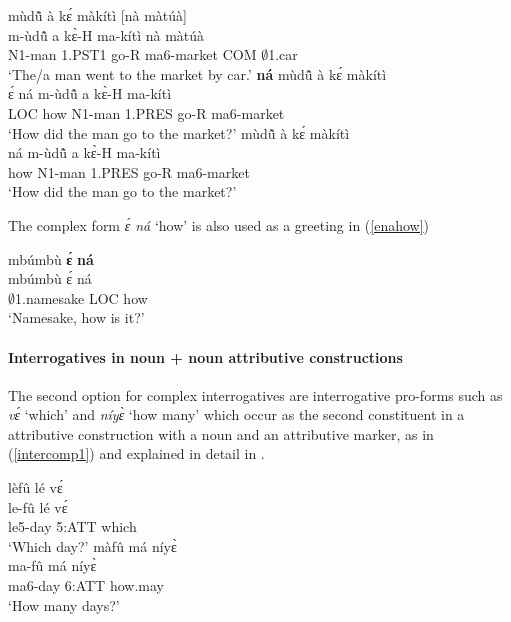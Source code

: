 \begin{exe}
\ex\label{ena}
\begin{xlist}
\ex \label{ena1}
  \glll mùdũ̂ à kɛ́ màkítì [nà màtúà] \\
    m-ùdũ̂ a kɛ̀-H ma-kítì nà màtúà \\
             N1-man 1.PST1 go-R ma6-market COM $\emptyset$1.car\\
   \trans `The/a man went to the market by car.'
\ex\label{ena2}
  {\bfseries ná} mùdũ̂ à kɛ́ màkítì  \\
        ɛ́ ná m-ùdũ̂ a kɛ̀-H ma-kítì \\
             LOC how N1-man 1.PRES go-R ma6-market \\
    \trans `How did the man go to the market?'
\ex\label{ena3}
  mùdũ̂ à kɛ́ màkítì  \\
        ná m-ùdũ̂ a kɛ̀-H ma-kítì \\
            how N1-man 1.PRES go-R ma6-market \\
    \trans `How did the man go to the market?'
\end {xlist}
\end {exe}

\noindent The complex form {\itshape ɛ́ ná} `how' is also used as a greeting in (\ref{enahow})

\begin{exe} 
\ex\label{enahow}
  \glll mbúmbù {\bfseries ɛ́} {\bfseries ná} \\
        mbúmbù ɛ́ ná \\
        $\emptyset$1.namesake LOC how  \\
    \trans `Namesake, how is it?'
\end{exe}





\paragraph{Interrogatives in noun + noun attributive constructions} The second option for complex interrogatives are interrogative pro-forms such as {\itshape vɛ́} `which' and {\itshape níyɛ̀} `how many' which occur as the second constituent in a attributive construction with a noun and an attributive marker, as in (\ref{intercomp1}) and explained in detail in .  


\begin{exe}
\ex\label{intercomp1}
\begin{xlist}
\ex\label{intercomp1a}
 \glll    lèfû lé vɛ́   \\
            le-fû lé vɛ́   \\
             le5-day 5:ATT which \\
   \trans `Which day?'
\ex\label{intercomp1b}
 \glll    màfû má níyɛ̀  \\
            ma-fû má níyɛ̀  \\
             ma6-day 6:ATT how.may  \\
   \trans `How many days?'
\end{xlist}
\end{exe}


